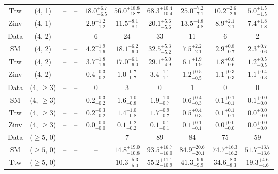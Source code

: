 \begin{table}[h!]
{\begin{tabular}{cccccccccc}
	Ttw & (4, 1) & -- & -- & $18.0^{+ 6.7 }_{- 6.5 }$ & $56.0^{+ 18.8 }_{- 18.7 }$ & $68.3^{+ 10.4 }_{- 10.4 }$ & $25.0^{+ 7.2 }_{- 7.1 }$ & $10.2^{+ 2.6 }_{- 2.6 }$ & $5.0^{+ 1.5 }_{- 1.5 }$ \\[0.5ex] 
	Zinv & (4, 1) & -- & -- & $2.9^{+ 1.2 }_{- 1.2 }$ & $11.5^{+ 8.1 }_{- 8.1 }$ & $20.1^{+ 5.6 }_{- 5.6 }$ & $13.5^{+ 4.8 }_{- 4.8 }$ & $8.9^{+ 2.1 }_{- 2.1 }$ & $7.4^{+ 1.8 }_{- 1.8 }$ \\[0.5ex] 
	Data & (4, 2) & -- & -- & 6 & 24 & 33 & 11 & 6 & 2 \\[0.5ex] 
	SM & (4, 2) & -- & -- & $4.2^{+ 1.9 }_{- 1.6 }$ & $18.1^{+ 6.2 }_{- 6.0 }$ & $32.5^{+ 5.3 }_{- 5.2 }$ & $7.5^{+ 2.2 }_{- 2.1 }$ & $2.9^{+ 0.8 }_{- 0.7 }$ & $2.3^{+ 0.7 }_{- 0.6 }$ \\[0.5ex] 
	Ttw & (4, 2) & -- & -- & $3.7^{+ 1.8 }_{- 1.6 }$ & $17.0^{+ 6.1 }_{- 6.0 }$ & $29.1^{+ 5.0 }_{- 4.9 }$ & $6.1^{+ 1.9 }_{- 1.9 }$ & $1.8^{+ 0.6 }_{- 0.6 }$ & $1.2^{+ 0.5 }_{- 0.5 }$ \\[0.5ex] 
	Zinv & (4, 2) & -- & -- & $0.4^{+ 0.3 }_{- 0.2 }$ & $1.0^{+ 0.7 }_{- 0.7 }$ & $3.4^{+ 1.1 }_{- 1.1 }$ & $1.2^{+ 0.5 }_{- 0.5 }$ & $1.1^{+ 0.3 }_{- 0.3 }$ & $1.1^{+ 0.4 }_{- 0.3 }$ \\[0.5ex] 
	Data & (4, $\ge3$) & -- & -- & 0 & 3 & 0 & 1 & 0 & 0 \\[0.5ex] 
	SM & (4, $\ge3$) & -- & -- & $0.2^{+ 0.3 }_{- 0.2 }$ & $1.6^{+ 1.0 }_{- 0.8 }$ & $1.9^{+ 1.0 }_{- 0.7 }$ & $0.6^{+ 0.4 }_{- 0.3 }$ & $0.1^{+ 0.1 }_{- 0.1 }$ & $0.1^{+ 0.0 }_{- 0.0 }$ \\[0.5ex] 
	Ttw & (4, $\ge3$) & -- & -- & $0.2^{+ 0.3 }_{- 0.2 }$ & $1.4^{+ 1.0 }_{- 0.8 }$ & $1.7^{+ 0.9 }_{- 0.7 }$ & $0.5^{+ 0.4 }_{- 0.3 }$ & $0.1^{+ 0.1 }_{- 0.1 }$ & $0.0^{+ 0.0 }_{- 0.0 }$ \\[0.5ex] 
	Zinv & (4, $\ge3$) & -- & -- & $0.0^{+ 0.0 }_{- 0.0 }$ & $0.1^{+ 0.2 }_{- 0.2 }$ & $0.1^{+ 0.1 }_{- 0.1 }$ & $0.1^{+ 0.1 }_{- 0.1 }$ & $0.0^{+ 0.0 }_{- 0.0 }$ & $0.0^{+ 0.0 }_{- 0.0 }$ \\[0.5ex] 
	Data & ($\ge5$, 0) & -- & -- & -- & 7 & 89 & 84 & 75 & 59 \\[0.5ex] 
	SM & ($\ge5$, 0) & -- & -- & -- & $14.8^{+ 19.0 }_{- 10.8 }$ & $93.5^{+ 16.7 }_{- 16.0 }$ & $84.9^{+ 20.6 }_{- 20.1 }$ & $74.7^{+ 16.3 }_{- 16.2 }$ & $51.7^{+ 13.7 }_{- 13.6 }$ \\[0.5ex] 
	Ttw & ($\ge5$, 0) & -- & -- & -- & $10.3^{+ 5.3 }_{- 5.0 }$ & $55.2^{+ 11.1 }_{- 10.9 }$ & $41.3^{+ 9.9 }_{- 9.9 }$ & $34.6^{+ 8.3 }_{- 8.3 }$ & $19.3^{+ 4.6 }_{- 4.6 }$ \\[0.5ex] 

\end{tabular}}
\end{table}
